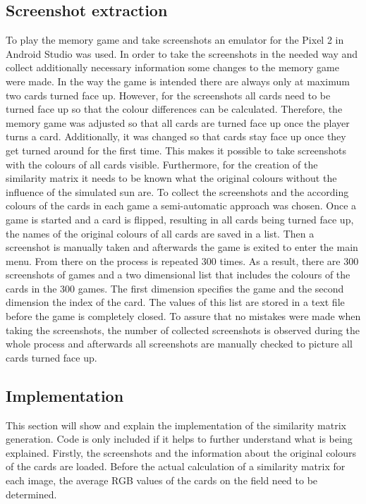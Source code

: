 \subsection{Screenshot extraction}
\label{screenshot_extraction}
To play the memory game and take screenshots an emulator for the Pixel 2 in Android Studio was used. In order to take the screenshots in the needed way and collect additionally necessary information some changes to the memory game were made. In the way the game is intended there are always only at maximum two cards turned face up. However, for the screenshots all cards need to be turned face up so that the colour differences can be calculated. Therefore, the memory game was adjusted so that all cards are turned face up once the player turns a card. Additionally, it was changed so that cards stay face up once they get turned around for the first time. This makes it possible to take screenshots with the colours of all cards visible. Furthermore, for the creation of the similarity matrix it needs to be known what the original colours without the influence of the simulated sun are. To collect the screenshots and the according colours of the cards in each game a semi-automatic approach was chosen. Once a game is started and a card is flipped, resulting in all cards being turned face up, the names of the original colours of all cards are saved in a list. Then a screenshot is manually taken and afterwards the game is exited to enter the main menu. From there on the process is repeated 300 times. As a result, there are 300 screenshots of games and a two dimensional list that includes the colours of the cards in the 300 games. The first dimension specifies the game and the second dimension the index of the card. The values of this list are stored in a text file before the game is completely closed. To assure that no mistakes were made when taking the screenshots, the number of collected screenshots is observed during the whole process and afterwards all screenshots are manually checked to picture all cards turned face up.

\newpage

\subsection{Implementation}
\label{implementation}
This section will show and explain the implementation of the similarity matrix generation. Code is only included if it helps to further understand what is being explained. Firstly, the screenshots and the information about the original colours of the cards are loaded. Before the actual calculation of a similarity matrix for each image, the average RGB values of the cards on the field need to be determined. 

